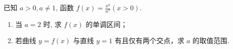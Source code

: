 \documentclass[class=ctexart,crop=false]{standalone}
\begin{document}
已知 $a>0,a \neq 1$, 函数 $f(x)=\frac{x^a}{a^x}(x>0)$.
\begin{enumerate}[label=(\arabic*)]
    \item 当 $a=2$ 时, 求 $f(x)$ 的单调区间；
    \item 若曲线 $y=f(x)$ 与直线 $y=1$ 有且仅有两个交点，求 $a$ 的取值范围.
\end{enumerate}
\end{document}
